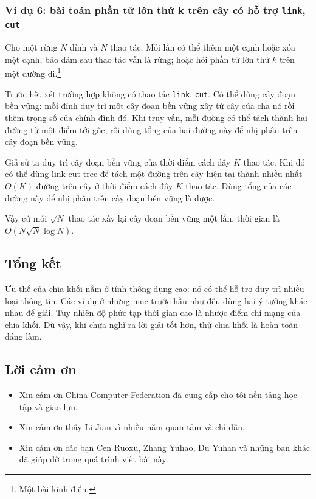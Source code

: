 \documentclass[11pt]{article}
\begin{document}
\subsubsection{Ví dụ 6: bài toán phần tử lớn thứ k trên cây có hỗ trợ \texttt{link}, \texttt{cut}}

Cho một rừng \(N\) đỉnh và \(N\) thao tác. Mỗi lần có thể thêm một cạnh hoặc
xóa một cạnh, bảo đảm sau thao tác vẫn là rừng; hoặc hỏi phần tử lớn thứ \(k\)
trên một đường đi.\footnote{Một bài kinh điển.}

Trước hết xét trường hợp không có thao tác \texttt{link}, \texttt{cut}. Có thể
dùng cây đoạn bền vững: mỗi đỉnh duy trì một cây đoạn bền vững xây từ cây của
cha nó rồi thêm trọng số của chính đỉnh đó. Khi truy vấn, mỗi đường có thể tách
thành hai đường từ một điểm tới gốc, rồi dùng tổng của hai đường này để nhị
phân trên cây đoạn bền vững.

Giả sử ta duy trì cây đoạn bền vững của thời điểm cách đây \(K\) thao tác. Khi
đó có thể dùng link-cut tree để tách một đường trên cây hiện tại thành nhiều
nhất \(O(K)\) đường trên cây ở thời điểm cách đây \(K\) thao tác. Dùng tổng của
các đường này để nhị phân trên cây đoạn bền vững là được.

Vậy cứ mỗi \(\sqrt N\) thao tác xây lại cây đoạn bền vững một lần, thời gian là
\(O(N\sqrt N\log N)\).

\subsection{Tổng kết}

Ưu thế của chia khối nằm ở tính thông dụng cao: nó có thể hỗ trợ duy trì nhiều
loại thông tin. Các ví dụ ở những mục trước hầu như đều dùng hai ý tưởng khác
nhau để giải. Tuy nhiên độ phức tạp thời gian cao là nhược điểm chí mạng của
chia khối. Dù vậy, khi chưa nghĩ ra lời giải tốt hơn, thử chia khối là hoàn
toàn đáng làm.

\subsection{Lời cảm ơn}

\begin{itemize}
  \item Xin cảm ơn China Computer Federation đã cung cấp cho tôi nền tảng học
  tập và giao lưu.
  \item Xin cảm ơn thầy Li Jian vì nhiều năm quan tâm và chỉ dẫn.
  \item Xin cảm ơn các bạn Cen Ruoxu, Zhang Yuhao, Du Yuhan và những bạn khác
  đã giúp đỡ trong quá trình viết bài này.
\end{itemize}
\end{document}
